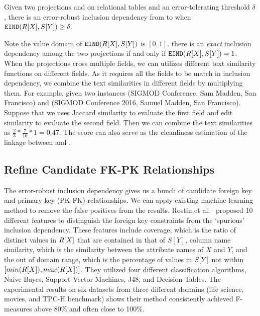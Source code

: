 \begin{definition}
Given two projections \RX and \SY on relational tables and an error-tolerating threshold $\delta$, there is an error-robust inclusion dependency from \X to \Y when $\EIND\geq\delta$.
\end{definition}

\iffalse
\dong{To add an example here.}
\fi


Note the value domain of $\EIND$ is $[0,1]$. there is an \emph{exact} inclusion dependency among the two projections if and only if $\EIND=1$. When the projections cross multiple fields, we can utilizes different text similarity functions on different fields. As it requires all the fields to be match in inclusion dependency, we combine the text similarities in different fields by multiplying them. For example, given two instances \textsf{(SIGMOD Conference, Sam Madden, San Francisco)} and \textsf{(SIGMOD Conference 2016, Samuel Madden, San Francisco)}. Suppose that we uses Jaccard similarity to evaluate the first field and edit similarity to evaluate the second field. Then we can combine the text similarities as $\frac{2}{3}*\frac{7}{10}*1=0.47$. The score \EIND can also serve as the cleanliness estimation of the linkage between \RX and \SY	.

\subsection{Refine Candidate FK-PK Relationships}

The error-robust inclusion dependency gives us a bunch of candidate foreign key and primary key (PK-FK) relationships. We can apply existing machine learning method to remove the false positives from the results.  Rostin et al.~\cite{WebDB2009} proposed 10 different features to distinguish the foreign key constraints from the `spurious' inclusion dependency. These features include coverage, which is the ratio of distinct values in $\R[X]$ that are contained in that of $S[Y]$, column name similarity, which is the similarity between the attribute names of $X$ and $Y$, and the out of domain range, which is the percentage of values in $\S[Y]$ not within $[min(\R[X]), max(\R[X])]$. They utilized four different classification algorithms, Naive Bayes, Support Vector Machines, J48, and Decision Tables. The experimental results on six datasets from three different domains (life science, movies, and TPC-H benchmark) shows their method consistently achieved F-measures above 80\% and often close to 100\%.





